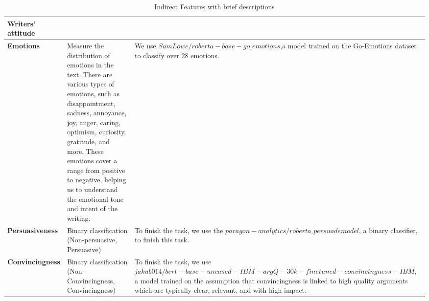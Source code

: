 \begin{table*}[ht]
\begin{tabular}{@{}l|p{}|p{}@{}}
\\ 
\midrule

\textbf{Writers' attitude}          & &  \\ \midrule
\textbf{Emotions}   &Measure the distribution of emotions in the text. There are various types of emotions, such as disappointment, sadness, annoyance, joy, anger, caring, optimism, curiosity, gratitude, and more. These emotions cover a range from positive to negative, helping us to understand the emotional tone and intent of the writing. & We use $SamLowe/roberta-base-go\_emotions$,a model trained on the Go-Emotions dataset to classify over 28 emotions. \\

\textbf{Persuasiveness}   &Binary classification (Non-persuasive, Persuasive)
 &To finish the task, we use the $paragon-analytics/roberta\_persuade model$, a binary classifier, to finish this task.\\ 
\textbf{Convincingness}   &Binary classification (Non-Convincingness, Convincingness) &To finish the task, we use $jakub014/bert-base-uncased-IBM-argQ-30k-finetuned-convincingness-IBM$, a model trained on the assumption that convincingness is linked to
high quality arguments which are typically clear, relevant, and with high impact.\\ \midrule


\bottomrule
\end{tabular}
\caption{Indirect Features with brief descriptions}
\label{tab:Indirect_Linguistic_Features_description}
\end{table*}
